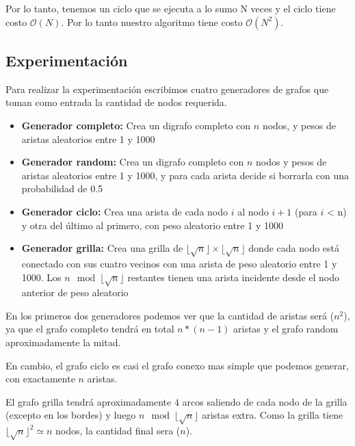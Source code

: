 Por lo tanto, tenemos un ciclo que se ejecuta a lo sumo N veces y el ciclo tiene costo $\mathcal{O}(N)$. Por lo tanto nuestro algoritmo tiene costo $\mathcal{O}(N^{2})$.

\subsection{Experimentación}

Para realizar la experimentación escribimos cuatro generadores de grafos que toman como entrada la cantidad de nodos requerida.

\begin{itemize}

    \item \textbf{
    \textcolor{YellowOrange}{Generador completo:}} Crea un digrafo completo con $n$ nodos, y pesos de aristas aleatorios entre 1 y 1000

    \item \textbf{\textcolor{OliveGreen}{Generador random:}} Crea un digrafo completo con $n$ nodos y pesos de aristas aleatorios entre 1 y 1000, y para cada arista decide si borrarla con una probabilidad de 0.5

    \item \textbf{\textcolor{BrickRed}{Generador ciclo:}} Crea una arista de cada nodo $i$ al nodo $i+1$ (para $i$ < n) y otra del último al primero, con peso aleatorio entre 1 y 1000

    \item \textbf{\textcolor{NavyBlue}{Generador grilla:}} Crea una grilla de $\lfloor \sqrt{n} \rfloor \times \lfloor \sqrt{n} \rfloor$ donde cada nodo está conectado con sus cuatro vecinos con una arista de peso aleatorio entre 1 y 1000. Los $n \mod \lfloor \sqrt{n} \rfloor$ restantes tienen una arista incidente desde el nodo anterior de peso aleatorio

\end{itemize}

En los primeros dos generadores podemos ver que la cantidad de aristas será \bigo($n^2$), ya que el grafo completo tendrá en total $n * (n-1)$ aristas y el grafo random aproximadamente la mitad.

En cambio, el grafo ciclo es casi el grafo conexo mas simple que podemos generar, con exactamente $n$ aristas.

El grafo grilla tendrá aproximadamente $4$ arcos saliendo de cada nodo de la grilla (excepto en los bordes) y luego $n \mod \lfloor \sqrt{n} \rfloor$ aristas extra. Como la grilla tiene $\lfloor \sqrt{n} \rfloor^2 \simeq n$ nodos, la cantidad final sera \bigo($n$).

